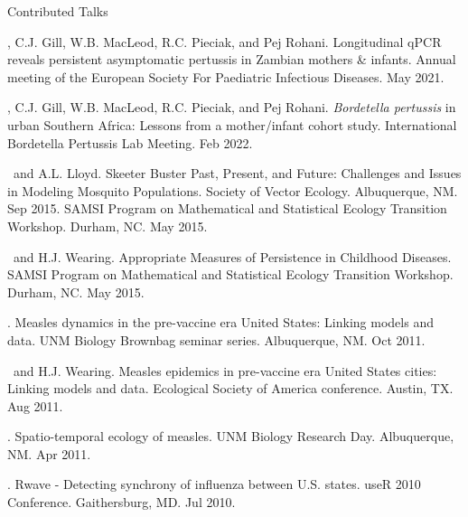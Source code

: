 \documentclass{resume} %
\begin{document}
\begin{rSection}{Contributed Talks}
\item \authSelf, C.J. Gill, W.B. MacLeod, R.C. Pieciak, and Pej Rohani. Longitudinal qPCR reveals persistent asymptomatic pertussis in Zambian mothers \& infants. Annual meeting of the European Society For Paediatric Infectious Diseases. May 2021.
\item \authSelf, C.J. Gill, W.B. MacLeod, R.C. Pieciak, and Pej Rohani.  \textit{Bordetella pertussis} in urban Southern Africa: Lessons from a mother/infant cohort study. International Bordetella Pertussis Lab Meeting. Feb 2022.
\item \authSelf\ and A.L. Lloyd.  Skeeter Buster Past, Present, and Future: Challenges and Issues in Modeling Mosquito Populations.
Society of Vector Ecology. Albuquerque, NM. Sep 2015.
SAMSI Program on Mathematical and Statistical Ecology Transition Workshop. Durham, NC. May 2015.
\item \authSelf\ and H.J. Wearing.  Appropriate Measures of Persistence in Childhood Diseases.
SAMSI Program on Mathematical and Statistical Ecology Transition Workshop. Durham, NC. May 2015.
\item \authSelf.  Measles dynamics in the pre-vaccine era United States: Linking
models and data. UNM Biology Brownbag seminar series. Albuquerque, NM. Oct 2011.
\item \authSelf\ and H.J. Wearing.  Measles epidemics in pre-vaccine era United States cities: Linking models and data. Ecological Society of America conference. Austin, TX. Aug 2011.
\item \authSelf.  Spatio-temporal ecology of measles. 
UNM Biology Research Day. Albuquerque, NM. Apr 2011.
\item \authSelf. Rwave - Detecting synchrony of influenza between U.S. states.
useR 2010 Conference. Gaithersburg, MD. Jul 2010.
\end{rSection}
\end{document}
